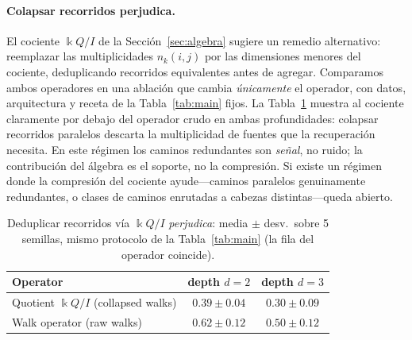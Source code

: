 \documentclass[runningheads]{llncs}
\newcommand{\kk}{\Bbbk}
\newcommand{\kQ}{\kk Q}
\begin{document}
\paragraph{Colapsar recorridos perjudica.}
El cociente $\kQ/I$ de la Sección~\ref{sec:algebra} sugiere un remedio
alternativo: reemplazar las multiplicidades $n_k(i,j)$ por las dimensiones
menores del cociente, deduplicando recorridos equivalentes antes de agregar.
Comparamos ambos operadores en una ablación que cambia \emph{únicamente} el
operador, con datos, arquitectura y receta de la Tabla~\ref{tab:main} fijos. La
Tabla~\ref{tab:quotient} muestra al cociente claramente por debajo del operador
crudo en ambas profundidades: colapsar recorridos paralelos descarta la
multiplicidad de fuentes que la recuperación necesita. En este régimen los
caminos redundantes son \emph{señal}, no ruido; la contribución del álgebra es
el soporte, no la compresión. Si existe un régimen donde la compresión del
cociente ayude---caminos paralelos genuinamente redundantes, o clases de
caminos enrutadas a cabezas distintas---queda abierto.

\begin{table}[t]
\centering
\caption{Deduplicar recorridos vía $\kQ/I$ \emph{perjudica}: media $\pm$ desv.\
sobre 5 semillas, mismo protocolo de la Tabla~\ref{tab:main} (la fila del
operador coincide).}
\label{tab:quotient}
\begin{tabular}{lcc}
\toprule
\textbf{Operator} & \textbf{depth $d=2$} & \textbf{depth $d=3$} \\
\midrule
Quotient $\kQ/I$ (collapsed walks) & $0.39\pm0.04$ & $0.30\pm0.09$ \\
Walk operator (raw walks)          & $\mathbf{0.62\pm0.12}$ & $\mathbf{0.50\pm0.12}$ \\
\bottomrule
\end{tabular}
\end{table}
\end{document}
